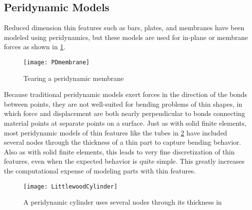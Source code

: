 \subsection{Peridynamic Models}
Reduced dimension thin features such as bars\cite{silling2003deformation,weckner2005effect,emmrich2007analysis,mikata2012analytical}, plates\cite{kilic2009prediction}, and membranes\cite{silling2005peridynamic} have been modeled using peridynamics, but these models are used for in-plane or membrane forces as shown in \cref{fig:PDmembrane}.
%
\begin{figure}[h]
  \centering
\texttt{[image: PDmembrane]}
\caption[Tearing a peridynamic membrane]{Tearing a peridynamic membrane \cite{silling2005peridynamic}}
\label{fig:PDmembrane}
\end{figure}
%
Because traditional peridynamic models exert forces in the direction of the bonds between points, they are not well-suited for bending problems of thin shapes, in which force and displacement are both nearly perpendicular to bonds connecting material points at separate points on a surface.
Just as with solid finite elements, most peridynamic models of thin features like the tubes in \cref{fig:LittlewoodCylinder} have included several nodes through the thickness of a thin part to capture bending behavior.
Also as with solid finite elements, this leads to very fine discretization of thin features, even when the expected behavior is quite simple.
This greatly increases the computational expense of modeling parts with thin features.
%
\begin{figure}[h!]
  \centering
\texttt{[image: LittlewoodCylinder]}
\caption[A peridynamic cylinder uses several nodes through its thickness]{A peridynamic cylinder uses several nodes through its thickness in \cite{littlewood2010simulation}}
\label{fig:LittlewoodCylinder}
\end{figure}
%

